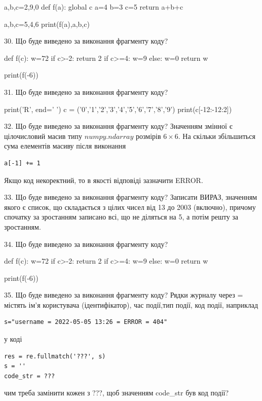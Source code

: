 \documentclass[11pt]{article}
\begin{document}
a,b,c=2,9,0
def f(a):
global c    a=4
    b=3
    c=5
    return a+b+c

a,b,c=5,4,6
print(f(a),a,b,c)

30. Що буде виведено за виконання фрагменту коду?

def f(c):
    w=72
    if c>-2: 
        return 2
    if c>=4:
         w=9
    else:
         w=0
    return w

print(f(-6))

31. Що буде виведено за виконання фрагменту коду?

print('R', end=' ')
c = ('0','1','2','3','4','5','6','7','8','9')
print(c[-12:-12:2])


32. Що буде виведено за виконання фрагменту коду?
Значенням змінної  є цілочисловий масив типу $numpy.ndarray$ розмірів $6{\times}6$. На скільки збільшиться сума елементів масиву  після виконання
\begin{verbatim}
a[-1] += 1
\end{verbatim}


Якщо код некоректний, то в якості відповіді зазначити ERROR.



33. Що буде виведено за виконання фрагменту коду?
Записати ВИРАЗ, значенням якого є список, що складається з цілих чисел від 13 до 2003 (включно), причому спочатку за зростанням записано всі, що не діляться на 5, а потім решту за зростанням.

34. Що буде виведено за виконання фрагменту коду?

def f(c):
    w=72
    if c>-2: 
        return 2
    if c>=4:
         w=9
    else:
         w=0
    return w

print(f(-6))

35. Що буде виведено за виконання фрагменту коду?
Рядки журналу через = містять ім'я користувача (ідентифікатор), час події,тип події, код події, наприклад
\begin{verbatim}
s="username = 2022-05-05 13:26 = ERROR = 404"
\end{verbatim}
у коді 
\begin{verbatim}
res = re.fullmatch('???', s) 
s = ''
code_str = ??? 
\end{verbatim}
чим треба замінити кожен з ???, щоб значенням code\_str був код події? 
\end{document}
